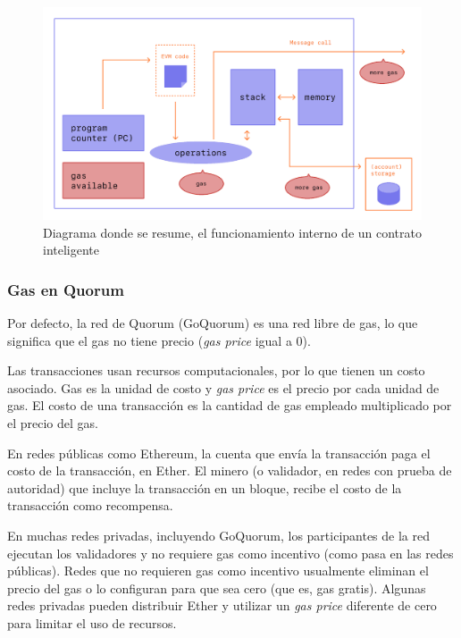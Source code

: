         \begin{figure}
          \centering
          \includegraphics[scale=0.4]{Graphics/gas.png}
          \caption{Diagrama donde se resume, el funcionamiento interno de un contrato inteligente}
          \label{smart_contract_squeme}
        \end{figure}

        \subsubsection{Gas en Quorum}
        Por defecto, la red de Quorum (GoQuorum) es una red libre de gas, lo que significa que el gas no 
        tiene precio (\textit{gas price} igual a 0).


        Las transacciones usan recursos computacionales, por lo que tienen un costo asociado.
        Gas es la unidad de costo y \textit{gas price} es el precio por cada unidad de gas. El costo de
        una transacción es la cantidad de gas empleado multiplicado por el precio del gas. 
        
        En redes públicas como Ethereum, la cuenta que envía la transacción paga el costo de la transacción,
        en Ether. El minero (o validador, en redes con prueba de autoridad) que incluye la 
        transacción en un bloque, recibe el costo de la transacción como recompensa.


        En muchas redes privadas, incluyendo GoQuorum, los participantes de la red ejecutan los 
        validadores y no requiere gas como incentivo (como pasa en las redes públicas). Redes que no 
        requieren gas como incentivo usualmente eliminan el precio del gas o lo configuran para que sea cero
        (que es, gas gratis). Algunas redes privadas pueden distribuir Ether y utilizar un \textit{gas price}
        diferente de cero para limitar el uso de recursos.


